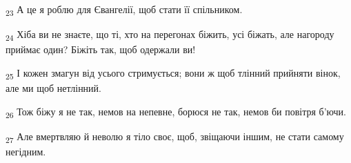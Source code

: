 \begin{tcolorbox}
\textsubscript{23} А це я роблю для Євангелії, щоб стати її спільником.
\end{tcolorbox}
\begin{tcolorbox}
\textsubscript{24} Хіба ви не знаєте, що ті, хто на перегонах біжить, усі біжать, але нагороду приймає один? Біжіть так, щоб одержали ви!
\end{tcolorbox}
\begin{tcolorbox}
\textsubscript{25} І кожен змагун від усього стримується; вони ж щоб тлінний прийняти вінок, але ми щоб нетлінний.
\end{tcolorbox}
\begin{tcolorbox}
\textsubscript{26} Тож біжу я не так, немов на непевне, борюся не так, немов би повітря б'ючи.
\end{tcolorbox}
\begin{tcolorbox}
\textsubscript{27} Але вмертвляю й неволю я тіло своє, щоб, звіщаючи іншим, не стати самому негідним.
\end{tcolorbox}
